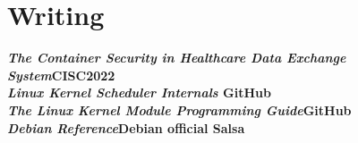 \section*{Writing}
\textbf{{\emph{The Container Security in Healthcare Data Exchange System}}\hfill{CISC2022}}\\
\textbf{{\emph{Linux Kernel Scheduler Internals}} \hfill {GitHub}}\\
\textbf{{\emph{The Linux Kernel Module Programming Guide}}\hfill{GitHub}}\\
\textbf{{\emph{Debian Reference}}\hfill{Debian official Salsa}}\\

